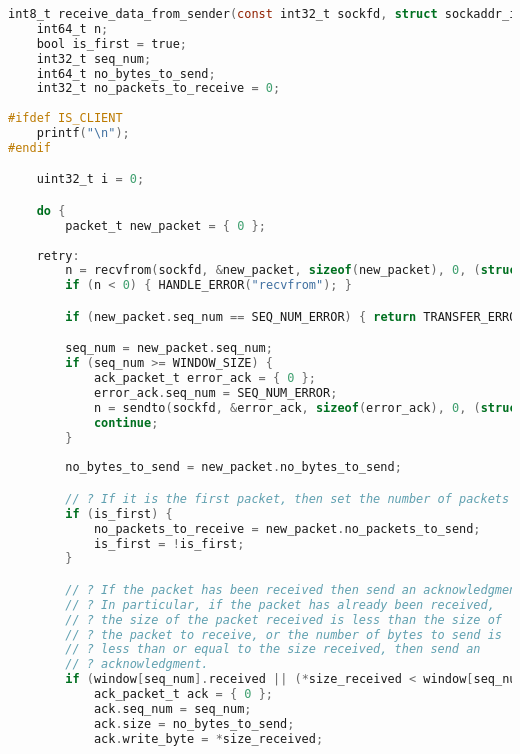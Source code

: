 \begin{lstlisting}[caption={\lstinlinebg{src/protocol.c}},language=C,keywords={can_send_packet, fwrite, static, print_progress, false, goto, continue, const, bool, do, for, fread, PACKET_SIZE, break, ifdef, endif, IS_CLIENT, timeval, gettimeofday, send_data_to_receiver, wait_ack, while, true, ack_packet_t, recvfrom, WRITE_BYTE_ERROR, MAX_ERRORS, double, SPQR_KB, FILE_TRANSFER_FAILED, EXIT_SUCCESS, FILE_TRANSFER_COMPLETED, printf, sendto, SEQ_NUM_ERROR, sizeof, int8_t, int32_t, uint16_t, int64_t, struct, sockaddr, sockaddr_in, char, socklen_t, uint32_t, uint64_t, WINDOW_SIZE, stat, fstat, fileno, set_timeout, FILE, NULL, HANDLE_ERROR, return, TRANSFER_ERROR, if, else, perror, exit, fprintf, stderr, MAX_RETRIES, spqr_assert, spqr_free, fclose, free, spqr_assert_ptr, fseek, SEEK_END, ftell, rewind, malloc, memset, sizeof, packet_t, MAX_READ_LINE, MAX_WINDOW_SIZE, MAX_PACKETS, MAX_ACKS}]
int8_t receive_data_from_sender(const int32_t sockfd, struct sockaddr_in *receiver_addr, socklen_t receiver_len, packet_t *window, int64_t *size_received, FILE *file) {
    int64_t n;
    bool is_first = true;
    int32_t seq_num;
    int64_t no_bytes_to_send;
    int32_t no_packets_to_receive = 0;
    
#ifdef IS_CLIENT
    printf("\n");
#endif

    uint32_t i = 0;

    do {
        packet_t new_packet = { 0 };
    
    retry:
        n = recvfrom(sockfd, &new_packet, sizeof(new_packet), 0, (struct sockaddr *) receiver_addr, &receiver_len);
        if (n < 0) { HANDLE_ERROR("recvfrom"); }

        if (new_packet.seq_num == SEQ_NUM_ERROR) { return TRANSFER_ERROR; }

        seq_num = new_packet.seq_num;
        if (seq_num >= WINDOW_SIZE) {
            ack_packet_t error_ack = { 0 };
            error_ack.seq_num = SEQ_NUM_ERROR;
            n = sendto(sockfd, &error_ack, sizeof(error_ack), 0, (struct sockaddr *) receiver_addr, receiver_len);
            continue;
        }
        
        no_bytes_to_send = new_packet.no_bytes_to_send;

        // ? If it is the first packet, then set the number of packets to receive.
        if (is_first) {
            no_packets_to_receive = new_packet.no_packets_to_send;
            is_first = !is_first;
        }

        // ? If the packet has been received then send an acknowledgment.
        // ? In particular, if the packet has already been received,
        // ? the size of the packet received is less than the size of
        // ? the packet to receive, or the number of bytes to send is
        // ? less than or equal to the size received, then send an
        // ? acknowledgment.
        if (window[seq_num].received || (*size_received < window[seq_num].no_bytes_to_send) || (no_bytes_to_send <= *size_received)) {
            ack_packet_t ack = { 0 };
            ack.seq_num = seq_num;
            ack.size = no_bytes_to_send;
            ack.write_byte = *size_received;
            

\end{lstlisting}
